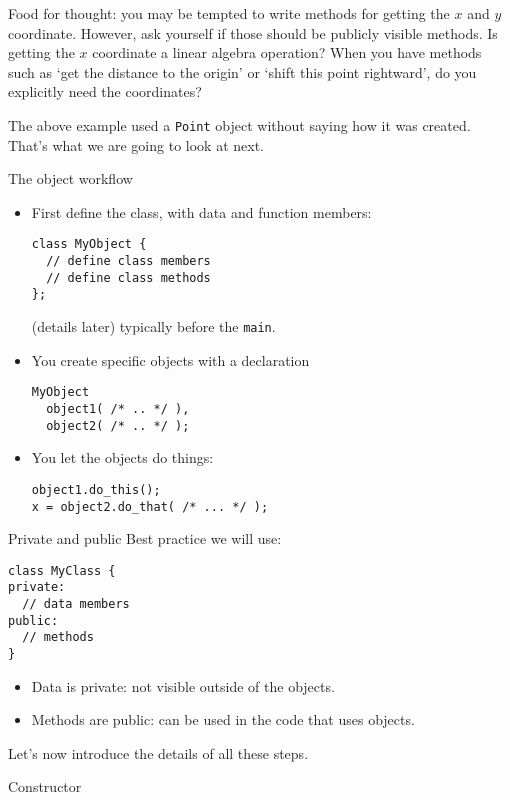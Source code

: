 Food for thought: you may be tempted  to  write methods for getting the $x$ and $y$
coordinate. However, ask yourself if those should be publicly visible methods.
Is getting the $x$ coordinate a linear algebra operation? When you have methods
such as `get the distance to the origin' or `shift this point rightward',
do you explicitly need the coordinates?

The above example used a \lstinline{Point} object without saying
how it was created.
That's what we are going to look at next.

\begin{block}{The object workflow}
  \label{sl:object-flow}
  \begin{itemize}
  \item First define the class, with data and function members:
\begin{lstlisting}
class MyObject {
  // define class members
  // define class methods
};
\end{lstlisting}
(details later)
typically before the \lstinline{main}.
  \item You create specific objects with a declaration
\begin{lstlisting}
MyObject
  object1( /* .. */ ),
  object2( /* .. */ );    
\end{lstlisting}
  \item You let the objects do things:
\begin{lstlisting}
object1.do_this();
x = object2.do_that( /* ... */ );
\end{lstlisting}
  \end{itemize}
\end{block}

\begin{block}{Private and public}
  \label{sl:public-private-basic}
  Best practice we will use:
\begin{lstlisting}
class MyClass {
private:
  // data members
public:
  // methods
}
\end{lstlisting}
\begin{itemize}
\item Data is private: not visible outside of the objects.
\item Methods are public: can be used in the code that uses objects.
\end{itemize}
\end{block}

Let's now introduce the details of all these steps.

 {Constructor}
\label{sec:simple-constructor}

